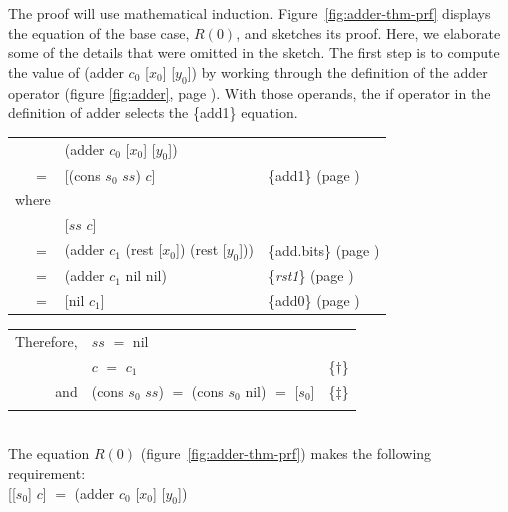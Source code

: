 The proof will use mathematical induction.
Figure~\ref{fig:adder-thm-prf}
displays the equation of the base case, $R(0)$,
and sketches its proof. Here, we elaborate some of the details
that were omitted in the sketch.
The first step is
to compute the value of \textsf{(adder $c_0$ [$x_0$] [$y_0$])}
by working through the definition of the \textsf{adder} operator
(figure \ref{fig:adder}, page \pageref{fig:adder}).
With those operands, the \textsf{if} operator in
the definition of \textsf{adder} selects the \{add1\} equation.
\begin{center}
\begin{tabular}{rll}
       & \textsf{(adder $c_0$ [$x_0$] [$y_0$])}              & \\
\vspace{1mm}
$=$    & \textsf{[(cons $s_0$ $ss$) $c$]}                    & \{add1\} (page \pageref {fig:adder})  \\
where  &&\\
       & \textsf{[$ss$  $c$]}                                & \\
$=$    & \textsf{(adder $c_1$ (rest [$x_0$]) (rest [$y_0$]))}& \{add.bits\} (page \pageref {fig:adder}) \\
$=$    & \textsf{(adder $c_1$ nil nil)}                      & \{\emph{rst1}\} (page \pageref {rst1}) \\
$=$    & \textsf{[nil  $c_1$]}                               & \{add0\} (page \pageref {fig:adder}) \\
\end{tabular}
\end{center}
\addtolength{\tabcolsep}{-1mm}
\begin{tabular}{rll}
Therefore, & $ss$ $=$ \textsf{nil}                                       & \\
           & $c$ $=$ $c_1$                                      & \{$\dagger$\} \\
and        & \textsf{(cons $s_0$ $ss$}) $=$ \textsf{(cons $s_0$ nil)} $=$ \textsf{[$s_0$]} & \{$\ddagger$\}\\
           &                                                    & \\
\end{tabular}\\
\addtolength{\tabcolsep}{1mm}
The equation $R(0)$ (figure~\ref{fig:adder-thm-prf}) makes the following requirement:
\vspace{1mm}\\
\hspace*{1.5cm}\textsf{[[$s_0$] $c$]} $=$ \textsf{(adder $c_0$ [$x_0$] [$y_0$])}
